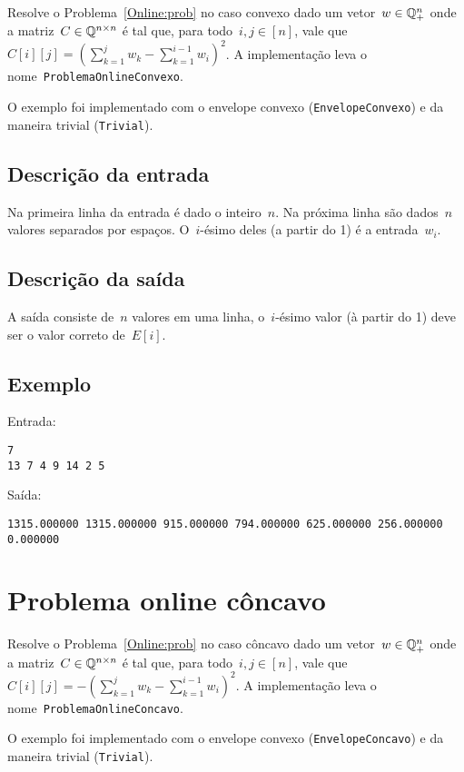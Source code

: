 Resolve o Problema~\ref{Online:prob} no caso convexo dado um vetor~$w \in \mathbb{Q}^n_+$ onde a matriz~$C \in \mathbb{Q}^{n \times n}$ é tal que, para todo~$i,j\in[n]$, vale que~$C[i][j] = (\sum_{k=1}^j w_k - \sum_{k=1}^{i-1} w_i)^2$. A implementação leva o nome~\texttt{ProblemaOnlineConvexo}.

O exemplo foi implementado com o envelope convexo (\texttt{EnvelopeConvexo}) e da maneira trivial (\texttt{Trivial}).

\subsection{Descrição da entrada}
Na primeira linha da entrada é dado o inteiro~$n$. Na próxima linha são dados~$n$ valores separados por espaços. O~$i$-ésimo deles (a partir do 1) é a entrada~$w_i$.

\subsection{Descrição da saída}
A saída consiste de~$n$ valores em uma linha, o~$i$-ésimo valor (à partir do 1) deve ser o valor correto de~$E[i]$.

\subsection{Exemplo}
Entrada:
\begin{verbatim}
7
13 7 4 9 14 2 5
\end{verbatim}
Saída:
\begin{verbatim}
1315.000000 1315.000000 915.000000 794.000000 625.000000 256.000000 0.000000
\end{verbatim}


\section{Problema online côncavo} \label{ProblemaOnlineConcavo}

Resolve o Problema~\ref{Online:prob} no caso côncavo dado um vetor~$w \in \mathbb{Q}^n_+$ onde a matriz~$C \in \mathbb{Q}^{n \times n}$ é tal que, para todo~$i,j\in[n]$, vale que~$C[i][j] = -(\sum_{k=1}^j w_k - \sum_{k=1}^{i-1} w_i)^2$. A implementação leva o nome~\texttt{ProblemaOnlineConcavo}.

O exemplo foi implementado com o envelope convexo (\texttt{EnvelopeConcavo}) e da maneira trivial (\texttt{Trivial}).

